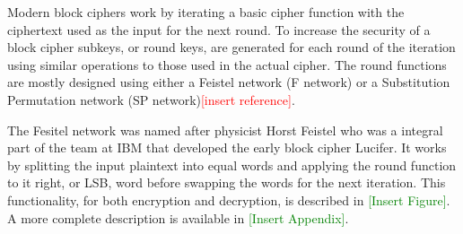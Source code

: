 \documentclass[12pt,twoside,a4paper]{report}
\begin{document}
    Modern block ciphers work by iterating a basic cipher function with the ciphertext used as the input for the next round.
    To increase the security of a block cipher subkeys, or round keys, are generated for each round of the iteration using similar operations to those used in the actual cipher.
    The round functions are mostly designed using either a Feistel network (F network) or a Substitution Permutation network (SP network)\textcolor{red}{[insert reference]}.
    
    
    The Fesitel network was named after physicist Horst Feistel who was a integral part of the team at IBM that developed the early block cipher Lucifer. It works by splitting the input plaintext into equal words and applying the round function to it right, or LSB, word before swapping the words for the next iteration. This functionality, for both encryption and decryption, is described in \textcolor{green}{[Insert Figure]}. A more complete description is available in \textcolor{green}{[Insert Appendix]}.
    
    
\end{document}
